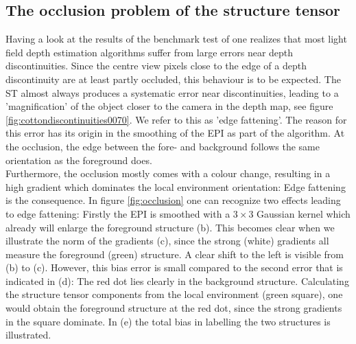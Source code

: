 \documentclass  [
  paper    = a4,
  BCOR     = 10mm,
  twoside,
  fontsize = 12pt,
  fleqn,
  toc      = bibnumbered,
  toc      = listofnumbered,
  numbers  = noendperiod,
  headings = normal,
  listof   = leveldown,
  version  = 3.03
]                                       {scrreprt}
\begin{document}
 \subsection{The occlusion problem of the structure tensor}
 \label{sec:occlusionproblem}
 Having a look at the results of the benchmark test of \cite{honauer2016benchmark} one realizes that most light field depth estimation algorithms suffer from large errors near depth discontinuities. Since the centre view pixels close to the edge of a depth discontinuity are at least partly occluded, this behaviour is to be expected. The ST almost always produces a systematic error near discontinuities, leading to a 'magnification' of the object closer to the camera in the depth map, see figure \ref{fig:cottondiscontinuities0070}. We refer to this as 'edge fattening'. The reason for this error has its origin in the smoothing of the EPI as part of the algorithm.  At the occlusion, the edge between the fore- and background follows the same orientation as the foreground does. \\
  Furthermore, the occlusion mostly comes with a colour change, resulting in a high gradient which dominates the local environment orientation: Edge fattening is the consequence. In figure \ref{fig:occlusion} one can recognize two effects leading to edge fattening: Firstly the EPI is smoothed with a $3\times 3$ Gaussian kernel which already will enlarge the foreground structure (b). This becomes clear when we illustrate the norm of the gradients (c), since the strong (white) gradients all measure the foreground (green) structure. A clear shift to the left is visible from (b) to (c). However, this bias error is small compared to the second error that is indicated in (d): The red dot lies clearly in the background structure. Calculating the structure tensor components from the local environment (green square), one would obtain the foreground structure at the red dot, since the strong gradients in the square dominate. In (e) the total bias in labelling the two structures is illustrated. 
\end{document}
